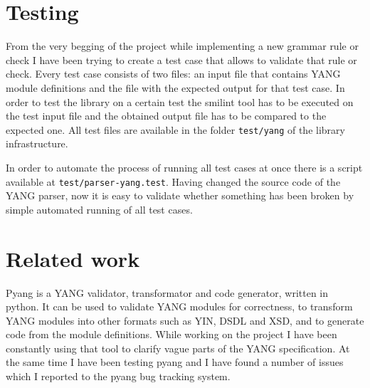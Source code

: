 \documentclass[conference]{IEEEtran}
\begin{document}
\section{Testing}
From the very begging of the project  while implementing a new grammar rule or check I have been trying to create a test case that allows to validate that rule or check. 
Every test case consists of two files: an input file that contains YANG module definitions and the file with the expected output for that test case. 
In order to test the library on a certain test the smilint tool has to be executed on the test input file and the obtained output file has to be compared to the expected one. 
All test files are available in the folder 	\texttt{test/yang} of the library infrastructure.

In order to automate the process of running all test cases at once there is a script available at \texttt{test/parser-yang.test}. 
Having changed the source code of the YANG parser, now it is easy to validate whether something has been broken by simple automated running of all test cases.

\section{Related work}
Pyang \cite{bib8} is a YANG validator, transformator and code generator, written in python.
It can be used to validate YANG modules for correctness, to transform YANG modules into other formats such as YIN, DSDL and XSD, 
and to generate code from the module definitions. 
While working on the project I have been constantly using that tool to clarify vague parts of the YANG specification.
At the same time I have been testing pyang and I have found a number of issues which I reported to the pyang bug tracking system.
\end{document}
